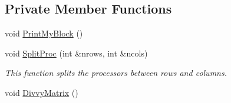 \subsection*{Private Member Functions}
\begin{DoxyCompactItemize}
\item 
void \hyperlink{classJKBuilder_1_1DistributedMatrix_a83da6054896e4107ab7e0c71fe0067ff}{PrintMyBlock} ()
\item 
void \hyperlink{classJKBuilder_1_1DistributedMatrix_a97f9cb6c12da83dc8006d442247a769a}{SplitProc} (int \&nrows, int \&ncols)
\begin{DoxyCompactList}\small\item\em This function splits the processors between rows and columns. \item\end{DoxyCompactList}\item 
void \hyperlink{classJKBuilder_1_1DistributedMatrix_a425fa9d0b5ab98afbe7233895795060f}{DivvyMatrix} ()
\end{DoxyCompactItemize}
